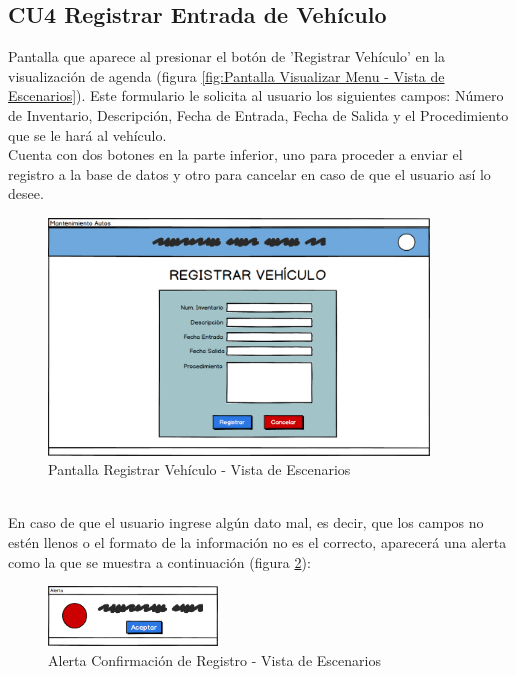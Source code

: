 \subsection{CU4 Registrar Entrada de Vehículo}
Pantalla que aparece al presionar el botón de 'Registrar Vehículo' en la visualización de agenda (figura \ref{fig:Pantalla Visualizar Menu - Vista de Escenarios}). Este formulario le solicita al usuario los siguientes campos: Número de Inventario, Descripción, Fecha de Entrada, Fecha de Salida y el Procedimiento que se le hará al vehículo. 
\\
Cuenta con dos botones en la parte inferior, uno para proceder a enviar el registro a la base de datos y otro para cancelar en caso de que el usuario así lo desee. 
\\
\begin{figure}[!h]
	\centering
	\includegraphics[width=0.9\textwidth]{./diseno/vescenarios/imagenes/registrarVehiculo}
	\caption{Pantalla Registrar Vehículo - Vista de Escenarios}
	\label{fig:Pantalla Registrar Vehículo - Vista de Escenarios}
\end{figure}
\\
En caso de que el usuario ingrese algún dato mal, es decir, que los campos no estén llenos o el formato de la información no es el correcto, aparecerá una alerta como la que se muestra a continuación (figura \ref{fig:Alerta2 - Vista de Escenarios}):
\begin{figure}[!h]
	\centering
	\includegraphics[width=0.4\textwidth]{./diseno/vescenarios/imagenes/alerta}
	\caption{Alerta Confirmación de Registro - Vista de Escenarios}
	\label{fig:Alerta2 - Vista de Escenarios}
\end{figure}
\clearpage